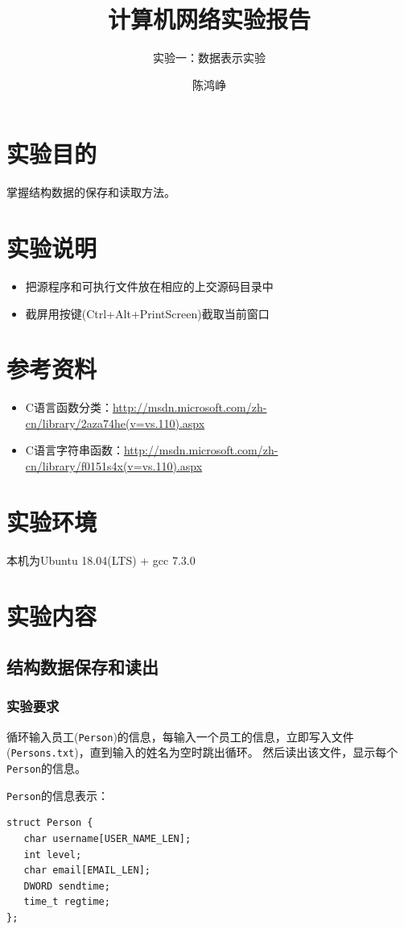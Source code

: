 \documentclass[logo,reportComp]{thesis}
\title{计算机网络实验报告}
\subtitle{实验一：数据表示实验}
\author{陈鸿峥}
\begin{document}
\maketitle

\section{实验目的}
掌握结构数据的保存和读取方法。

\section{实验说明}
\begin{itemize}
	\item 把源程序和可执行文件放在相应的上交源码目录中
	\item 截屏用按键(Ctrl+Alt+PrintScreen)截取当前窗口
\end{itemize}

\section{参考资料}
\begin{itemize}
	\item C语言函数分类：\url{http://msdn.microsoft.com/zh-cn/library/2aza74he(v=vs.110).aspx}
	\item C语言字符串函数：\url{http://msdn.microsoft.com/zh-cn/library/f0151s4x(v=vs.110).aspx}
\end{itemize}

\section{实验环境}
本机为Ubuntu 18.04(LTS) + gcc 7.3.0

\section{实验内容}
\subsection{结构数据保存和读出}
\subsubsection{实验要求}
循环输入员工(\verb'Person')的信息，每输入一个员工的信息，立即写入文件(\verb'Persons.txt')，直到输入的姓名为空时跳出循环。
然后读出该文件，显示每个\verb'Person'的信息。

\verb'Person'的信息表示：
\begin{lstlisting}
struct Person {
   char username[USER_NAME_LEN];
   int level;
   char email[EMAIL_LEN];
   DWORD sendtime;
   time_t regtime;
}; 
\end{lstlisting}
\end{document}
